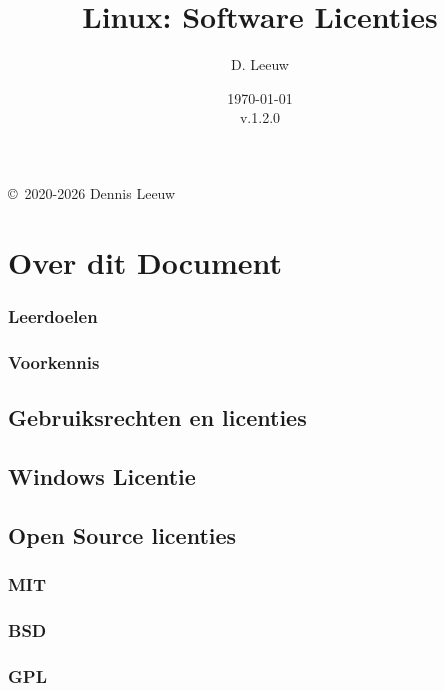 \documentclass[a4paper,12pt,twoside,openright,titlepage]{article}
\author{D. Leeuw}
\title{Linux: Software Licenties}
\date{\today\\v.1.2.0}
\begin{document}

\maketitle

\copyright\ 2020-2026 Dennis Leeuw\\




\chapter{Over dit Document}
\subsection{Leerdoelen}
\subsection{Voorkennis}



\section{Gebruiksrechten en licenties}

\section{Windows Licentie}
\section{Open Source licenties}
\subsection{MIT}

\subsection{BSD}

\subsection{GPL}




%

\printindex
\end{document}
